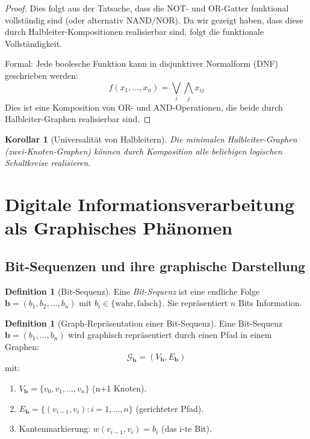 \documentclass[12pt, a4paper]{article}
\newtheorem{corollary}[theorem]{Korollar}
\theoremstyle{definition}
\newtheorem{definition}[theorem]{Definition}
\theoremstyle{remark}
\newcommand{\Bool}{\{\mathrm{wahr}, \mathrm{falsch}\}}
\newcommand{\Graph}{\mathcal{G}}
\begin{document}
\begin{proof}
Dies folgt aus der Tatsache, dass die NOT- und OR-Gatter funktional vollständig sind (oder alternativ NAND/NOR). Da wir gezeigt haben, dass diese durch Halbleiter-Kompositionen realisierbar sind, folgt die funktionale Vollständigkeit.

Formal: Jede boolesche Funktion kann in disjunktiver Normalform (DNF) geschrieben werden:
\[
  f(x_1, \ldots, x_n) = \bigvee_{i} \bigwedge_j x_{ij}
\]
Dies ist eine Komposition von OR- und AND-Operationen, die beide durch Halbleiter-Graphen realisierbar sind.
\end{proof}

\begin{corollary}[Universalität von Halbleitern]
Die minimalen Halbleiter-Graphen (zwei-Knoten-Graphen) können durch Komposition alle beliebigen logischen Schaltkreise realisieren.
\end{corollary}

\section{Digitale Informationsverarbeitung als Graphisches Phänomen}
\label{sec:information}

\subsection{Bit-Sequenzen und ihre graphische Darstellung}
\label{subsec:bit_sequenzen}

\begin{definition}[Bit-Sequenz]
\label{def:bit_sequenz}
Eine \emph{Bit-Sequenz} ist eine endliche Folge $\mathbf{b} = (b_1, b_2, \ldots, b_n)$ mit $b_i \in \Bool$. Sie repräsentiert $n$ Bits Information.
\end{definition}

\begin{definition}[Graph-Repräsentation einer Bit-Sequenz]
\label{def:graph_bit_sequenz}
Eine Bit-Sequenz $\mathbf{b} = (b_1, \ldots, b_n)$ wird graphisch repräsentiert durch einen Pfad in einem Graphen:
\[
  \Graph_{\mathbf{b}} = (V_{\mathbf{b}}, E_{\mathbf{b}})
\]
mit:
\begin{enumerate}[label=(\alph*)]
  \item $V_{\mathbf{b}} = \{v_0, v_1, \ldots, v_n\}$ (n+1 Knoten).
  \item $E_{\mathbf{b}} = \{(v_{i-1}, v_i) : i = 1, \ldots, n\}$ (gerichteter Pfad).
  \item Kantenmarkierung: $w(v_{i-1}, v_i) = b_i$ (das i-te Bit).
\end{enumerate}
\end{definition}
\end{document}
